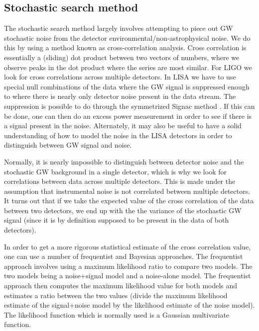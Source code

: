 \subsection{Stochastic search method}

%
The stochastic search method largely involves attempting to piece out \ac{GW} stochastic noise from the detector environmental/non-astrophysical noise. We do this by using a method known as cross-correlation analysis. Cross correlation is essentially a (sliding) dot product between two vectors of numbers, where we observe peaks in the dot product where the series are most similar. For \ac{LIGO} we look for cross correlations across multiple detectors. In \ac{LISA} we have to use special null combinations of the data where the \ac{GW} signal is suppressed enough to where there is nearly only detector noise present in the data stream. The suppression is possible to do through the symmetrized Signac method \cite{PhysRevD.64.062002}. If this can be done, one can then do an excess power measurement in order to see if there is a signal present in the noise. Alternately, it may also be useful to have a solid understanding of how to model the noise in the \ac{LISA} detectors in order to distinguish between \ac{GW} signal and noise. 

Normally, it is nearly impossible to distinguish between detector noise and the stochastic \ac{GW} background in a single detector, which is why we look for correlations between data across multiple detectors. This is made under the assumption that instrumental noise is not correlated between multiple detectors. It turns out that if we take the expected value of the cross correlation of the data between two detectors, we end up with the the variance of the stochastic \ac{GW} signal (since it is by definition supposed to be present in the data of both detectors).

%
%
In order to get a more rigorous statistical estimate of the cross correlation value, one can use a number of frequentist and Bayesian approaches. The frequentist approach involves using a maximum likelihood ratio to compare two models. The two models being a noise+signal model and a noise-alone model. The frequentist approach then computes the maximum likelihood value for both models and estimates a ratio between the two values (divide the maximum likelihood estimate of the signal+noise model by the likelihood estimate of the noise model). The likelihood function which is normally used is a Gaussian multivariate function.


